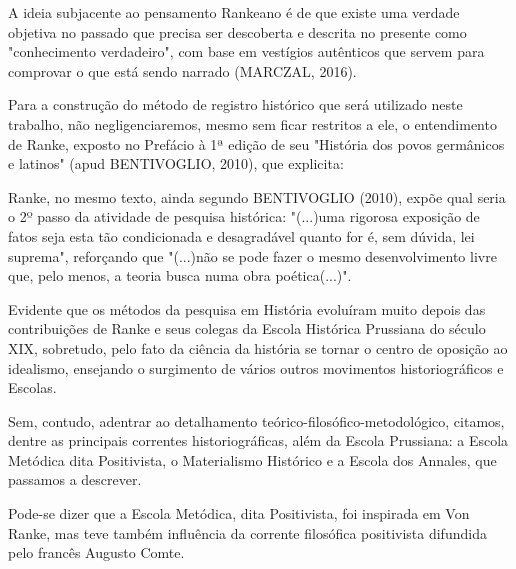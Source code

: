 A ideia subjacente ao pensamento Rankeano é de que existe uma verdade objetiva no passado que precisa ser descoberta e descrita no presente como "conhecimento verdadeiro", com base em vestígios autênticos que servem para comprovar o que está sendo narrado (MARCZAL, 2016).

Para a construção do método de registro histórico que será utilizado neste trabalho, não negligenciaremos, mesmo sem ficar restritos a ele, o entendimento de Ranke, exposto no Prefácio à 1ª edição de seu "História dos povos germânicos e latinos"  (apud BENTIVOGLIO, 2010), que explicita:


\noindent\begin{center}\mbox{\centering{}}\end{center}


Ranke, no mesmo texto, ainda segundo  BENTIVOGLIO (2010), expõe qual seria o 2º passo da atividade de pesquisa histórica: "(...)uma rigorosa exposição de fatos seja esta tão condicionada e desagradável quanto for é, sem dúvida, lei suprema", reforçando que "(...)não se pode fazer o mesmo desenvolvimento livre que, pelo menos, a teoria busca numa obra poética(...)".

Evidente que os métodos da pesquisa em História evoluíram muito depois das contribuições de Ranke e seus colegas da Escola Histórica Prussiana do século XIX, sobretudo, pelo fato da ciência  da história se tornar o centro de oposição ao idealismo, ensejando o surgimento de vários outros movimentos historiográficos e Escolas.

Sem, contudo, adentrar ao detalhamento teórico-filosófico-metodológico, citamos, dentre as principais correntes historiográficas, além da Escola Prussiana: a Escola Metódica dita Positivista, o Materialismo Histórico e a Escola dos Annales, que passamos a descrever.

Pode-se dizer que a Escola Metódica, dita Positivista, foi inspirada em Von Ranke, mas teve também influência da corrente filosófica positivista difundida pelo francês Augusto Comte.

